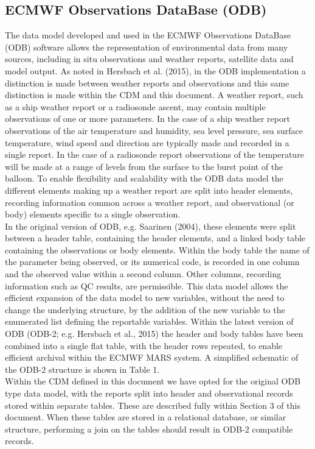 \documentclass[a4paper,12pt]{article}
\begin{document}
\subsection{ECMWF Observations DataBase (ODB)}

The data model developed and used in the ECMWF Observations DataBase (ODB) software allows the representation of environmental data from many sources, including in situ observations and weather reports, satellite data and model output. As noted in Hersbach et al. (2015), in the ODB implementation a distinction is made between weather reports and observations and this same distinction is made within the CDM and this document.  A weather report, such as a ship weather report or a radiosonde ascent, may contain multiple observations of one or more parameters. In the case of a ship weather report observations of the air temperature and humidity, sea level pressure, sea surface temperature, wind speed and direction are typically made and recorded in a single report. In the case of a radiosonde report observations of the temperature will be made at a range of levels from the surface to the burst point of the balloon. To enable flexibility and scalability with the ODB data model the different elements making up a weather report are split into header elements, recording information common across a weather report, and observational (or body) elements specific to a single observation.\\

In the original version of ODB, e.g. Saarinen (2004), these elements were split between a header table, containing the header elements, and a linked body table containing the observations or body elements. Within the body table the name of the parameter being observed, or its numerical code, is recorded in one column and the observed value within a second column.  Other columns, recording information such as QC results, are permissible. This data model allows the efficient expansion of the data model to new variables, without the need to change the underlying structure, by the addition of the new variable to the enumerated list defining the reportable variables. Within the latest version of ODB (ODB-2; e.g. Hersbach et al., 2015) the header and body tables have been combined into a single flat table, with the header rows repeated, to enable efficient archival within the ECMWF MARS system. A simplified schematic of the ODB-2 structure is shown in Table 1.\\

Within the CDM defined in this document we have opted for the original ODB type data model, with the reports split into header and observational records stored within separate tables. These are described fully within Section 3 of this document. When these tables are stored in a relational database, or similar structure, performing a join on the tables should result in ODB-2 compatible records.\\
\end{document}
